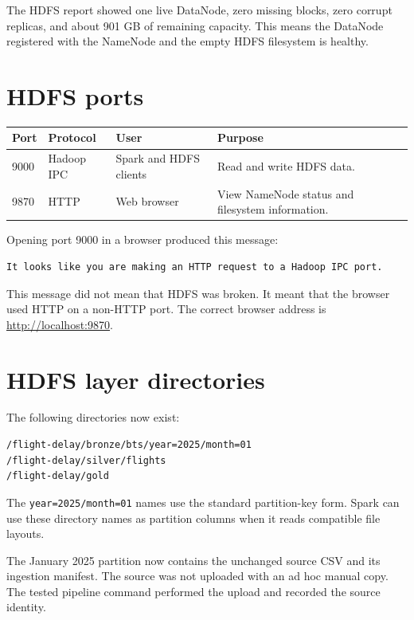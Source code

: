 \documentclass[11pt,a4paper]{article}
\begin{document}
The HDFS report showed one live DataNode, zero missing blocks, zero corrupt replicas, and about 901 GB of remaining capacity. This means the DataNode registered with the NameNode and the empty HDFS filesystem is healthy.

\section{HDFS ports}

\begin{center}
\begin{tabularx}{\textwidth}{@{}lllX@{}}
\toprule
Port & Protocol & User & Purpose \\
\midrule
9000 & Hadoop IPC & Spark and HDFS clients & Read and write HDFS data. \\
9870 & HTTP & Web browser & View NameNode status and filesystem information. \\
\bottomrule
\end{tabularx}
\end{center}

Opening port 9000 in a browser produced this message:

\begin{lstlisting}
It looks like you are making an HTTP request to a Hadoop IPC port.
\end{lstlisting}

This message did not mean that HDFS was broken. It meant that the browser used HTTP on a non-HTTP port. The correct browser address is \url{http://localhost:9870}.

\section{HDFS layer directories}

The following directories now exist:

\begin{lstlisting}
/flight-delay/bronze/bts/year=2025/month=01
/flight-delay/silver/flights
/flight-delay/gold
\end{lstlisting}

The \texttt{year=2025/month=01} names use the standard partition-key form. Spark can use these directory names as partition columns when it reads compatible file layouts.

The January 2025 partition now contains the unchanged source CSV and its ingestion manifest. The source was not uploaded with an ad hoc manual copy. The tested pipeline command performed the upload and recorded the source identity.
\end{document}
